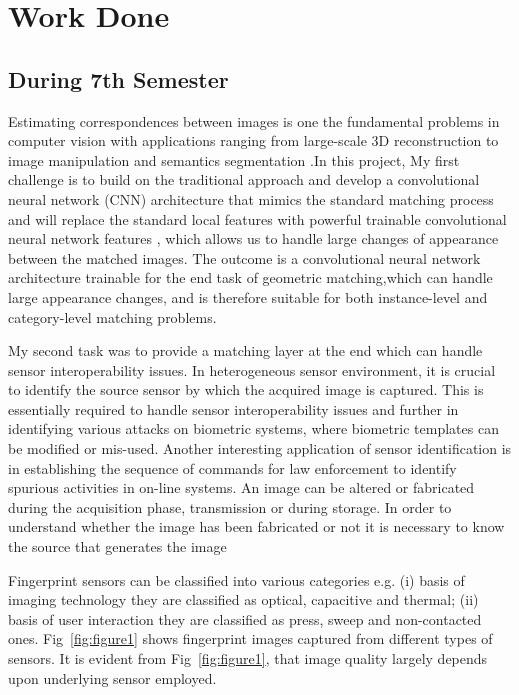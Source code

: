 \chapter{Work Done}
\label{chapter3}

\section{During 7th Semester}
Estimating correspondences between images is one the fundamental problems in computer vision\cite{20AA} with applications ranging from large-scale 3D reconstruction to image manipulation and semantics segmentation \cite{Rubinstein2013UnsupervisedJO}.In this project, My first challenge is to build on the traditional approach and develop a convolutional neural network (CNN) architecture that mimics the standard matching process and will replace the standard local features with powerful trainable convolutional neural network features \cite{Krizhevsky2012ImageNetCW}, which allows us to handle large changes of appearance between the matched images. The outcome is a convolutional neural network architecture trainable for the end task of geometric matching,which can handle large appearance changes, and is therefore suitable for both instance-level and category-level matching problems. 

	My second task was to provide a matching layer at the end which can handle sensor interoperability issues. In heterogeneous sensor environment, it is crucial to identify the source sensor by which the acquired image is captured. This is essentially required to handle sensor interoperability issues and further in identifying various attacks on biometric systems, where biometric templates can be modified or mis-used. Another interesting application of sensor identification is in establishing the sequence of commands for law enforcement to identify spurious activities in on-line systems. An image can be altered or fabricated during the acquisition phase, transmission or during storage. In order to understand whether the image has been fabricated or not it is necessary to know the source that generates the image

	Fingerprint sensors can be classified into various categories e.g. (i) basis of imaging technology they are classified as optical, capacitive and thermal; (ii) basis of user interaction they are classified as press, sweep and non-contacted ones. Fig~\ref{fig:figure1} shows fingerprint images captured from different types of sensors. It is evident from Fig~\ref{fig:figure1}, that image quality largely depends upon underlying sensor employed.

